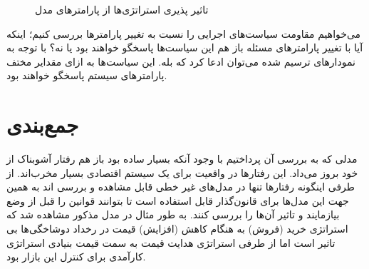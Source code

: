 \documentclass[13pt,onecolumn,a4paper]{article}
\begin{document}
\begin{figure}[H]
	\medskip
	\hfil
	\caption{تاثیر پذیری استراتژی‌ها از پارامترهای مدل}
	\label{fig:myfigure}
\end{figure}
می‌خواهیم مقاومت سیاست‌های اجرایی را نسبت به تغییر پارامترها بررسی کنیم؛ اینکه آیا با تغییر پارامترهای مسئله باز هم این سیاست‌ها پاسخگو خواهند بود یا نه؟ با توجه به نمودارهای ترسیم شده می‌توان ادعا کرد که بله. این سیاست‌ها به ازای مقدایر مختف پارامترهای سیستم پاسخگو خواهند بود.



\section{جمع‌بندی}
مدلی که به بررسی آن پرداختیم با وجود آنکه بسیار ساده بود باز هم رفتار آشوبناک از خود بروز می‌داد. این رفتارها در واقعیت برای یک سیستم اقتصادی بسیار مخرب‌اند. از طرفی اینگونه رفتارها تنها در مدل‌های غیر خطی قابل مشاهده و بررسی اند به همین جهت این مدل‌ها برای قانون‌گذار قابل استفاده است تا بتوانند قوانین را قبل از وضع بیازمایند و تاثیر آن‌ها را بررسی کنند. به طور مثال در مدل مذکور مشاهده شد که استراتژی خرید (فروش) به هنگام کاهش (افزایش) قیمت در رخداد دوشاخگی‌ها بی تاثیر است اما از طرفی استراتژی هدایت قیمت به سمت قیمت بنیادی استراتژی کارآمدی برای کنترل این بازار بود.





	
\end{document}

